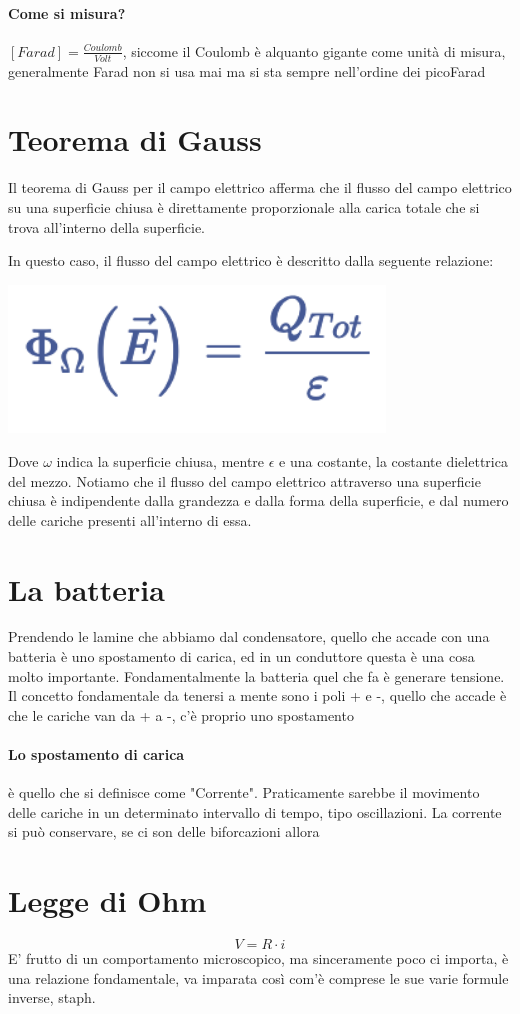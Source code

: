 \documentclass[12pt, a4paper, openany, oneside]{book}
\begin{document}
\paragraph{Come si misura?} $[Farad] = \frac{Coulomb}{Volt}$, siccome il 
Coulomb è alquanto gigante come unità di misura, generalmente Farad non si usa mai
ma si sta sempre nell'ordine dei picoFarad
\section{Teorema di Gauss}
Il teorema di Gauss per il campo elettrico afferma che il flusso del campo
 elettrico su una superficie chiusa è direttamente proporzionale alla carica 
 totale che si trova all’interno della superficie.

In questo caso, il flusso del campo elettrico è descritto dalla seguente relazione:
\begin{center}
	\includegraphics[width=0.75\textwidth]{21}
\end{center}
Dove $\omega$ indica la superficie chiusa, mentre $\epsilon$ e una costante, 
la costante dielettrica del mezzo.  
Notiamo che il flusso del campo elettrico attraverso una superficie chiusa è
 indipendente dalla grandezza e dalla forma della superficie, e dal numero delle 
 cariche presenti all’interno di essa.
\section{La batteria}
Prendendo le lamine che abbiamo dal condensatore, quello che accade con una 
batteria è uno spostamento di carica, ed in un conduttore questa è una cosa 
molto importante. Fondamentalmente la batteria quel che fa è generare tensione.\\
Il concetto fondamentale da tenersi a mente sono i poli + e -, quello che accade
è che le cariche van da + a -, c'è proprio uno spostamento
\paragraph{Lo spostamento di carica} è quello che si definisce come "Corrente". 
Praticamente sarebbe il movimento delle cariche in un determinato intervallo di
tempo, tipo oscillazioni.  La corrente si può conservare, se ci son delle 
biforcazioni allora 
\section{Legge di Ohm}
\[
	V = R \cdot i
\]
E' frutto di un comportamento microscopico, ma sinceramente poco ci importa, 
è una relazione fondamentale, va imparata così com'è comprese le sue varie 
formule inverse, staph.
    
    
\end{document}
